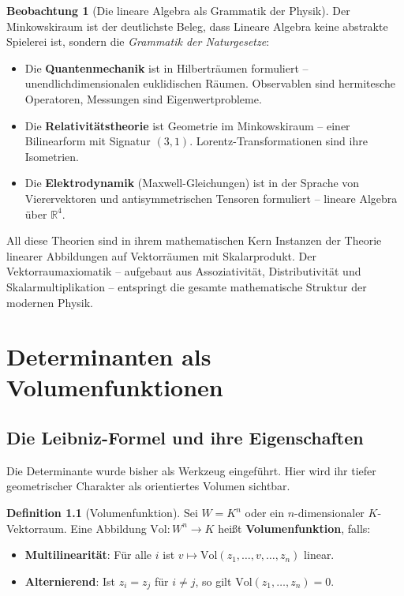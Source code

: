 ﻿\documentclass[a4paper,12pt]{report}
\theoremstyle{definition}
\newtheorem{definition}{Definition}
\newtheorem{beobachtung}{Beobachtung}
\begin{document}
\begin{beobachtung}[Die lineare Algebra als Grammatik der Physik]
    Der Minkowskiraum ist der deutlichste Beleg, dass Lineare Algebra
    keine abstrakte Spielerei ist, sondern die \emph{Grammatik der
    Naturgesetze}:
    \begin{itemize}
        \item[-] Die \textbf{Quantenmechanik} ist in Hilberträumen formuliert
              -- unendlichdimensionalen euklidischen Räumen. Observablen
              sind hermitesche Operatoren, Messungen sind Eigenwertprobleme.
        \item[-] Die \textbf{Relativitätstheorie} ist Geometrie im
              Minkowskiraum -- einer Bilinearform mit Signatur $(3,1)$.
              Lorentz-Transformationen sind ihre Isometrien.
        \item[-] Die \textbf{Elektrodynamik} (Maxwell-Gleichungen) ist
              in der Sprache von Vierervektoren und antisymmetrischen
              Tensoren formuliert -- lineare Algebra über $\mathbb{R}^4$.
    \end{itemize}
    All diese Theorien sind in ihrem mathematischen Kern Instanzen der
    Theorie linearer Abbildungen auf Vektorräumen mit Skalarprodukt.
    Der Vektorraumaxiomatik -- aufgebaut aus Assoziativität, Distributivität
    und Skalarmultiplikation -- entspringt die gesamte mathematische
    Struktur der modernen Physik.
\end{beobachtung}

\chapter{Determinanten als Volumenfunktionen}

\section{Die Leibniz-Formel und ihre Eigenschaften}

Die Determinante wurde bisher als Werkzeug eingeführt. Hier wird ihr
tiefer geometrischer Charakter als orientiertes Volumen sichtbar.

\begin{definition}[Volumenfunktion]
    Sei $W = K^n$ oder ein $n$-dimensionaler $K$-Vektorraum. Eine Abbildung
    $\mathrm{Vol} : W^n \to K$ heißt \textbf{Volumenfunktion}, falls:
    \begin{itemize}
        \item[-] \textbf{Multilinearität}: Für alle $i$ ist
              $v \mapsto \mathrm{Vol}(z_1, \dots, v, \dots, z_n)$ linear.
        \item[-] \textbf{Alternierend}: Ist $z_i = z_j$ für $i \neq j$,
              so gilt $\mathrm{Vol}(z_1, \dots, z_n) = 0$.
    \end{itemize}
\end{definition}
\end{document}
